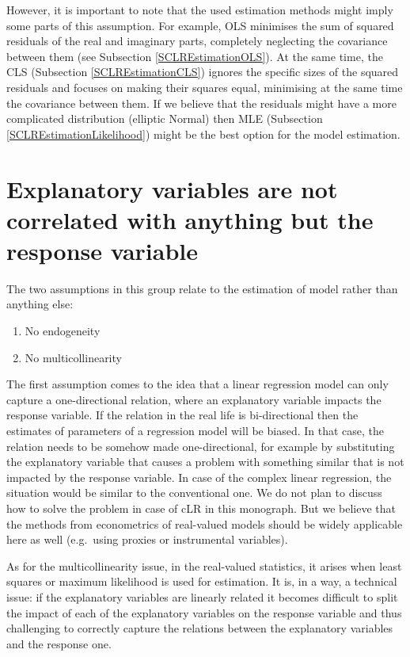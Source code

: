 \documentclass[
]{book}
\providecommand{\tightlist}{%
  \setlength{\itemsep}{0pt}\setlength{\parskip}{0pt}}
\begin{document}
However, it is important to note that the used estimation methods might imply some parts of this assumption. For example, OLS minimises the sum of squared residuals of the real and imaginary parts, completely neglecting the covariance between them (see Subsection \ref{SCLREstimationOLS}). At the same time, the CLS (Subsection \ref{SCLREstimationCLS}) ignores the specific sizes of the squared residuals and focuses on making their squares equal, minimising at the same time the covariance between them. If we believe that the residuals might have a more complicated distribution (elliptic Normal) then MLE (Subsection \ref{SCLREstimationLikelihood}) might be the best option for the model estimation.

\hypertarget{explanatory-variables-are-not-correlated-with-anything-but-the-response-variable}{%
\section{Explanatory variables are not correlated with anything but the response variable}\label{explanatory-variables-are-not-correlated-with-anything-but-the-response-variable}}

The two assumptions in this group relate to the estimation of model rather than anything else:

\begin{enumerate}
\def\labelenumi{\arabic{enumi}.}
\tightlist
\item
  No endogeneity
\item
  No multicollinearity
\end{enumerate}

The first assumption comes to the idea that a linear regression model can only capture a one-directional relation, where an explanatory variable impacts the response variable. If the relation in the real life is bi-directional then the estimates of parameters of a regression model will be biased. In that case, the relation needs to be somehow made one-directional, for example by substituting the explanatory variable that causes a problem with something similar that is not impacted by the response variable. In case of the complex linear regression, the situation would be similar to the conventional one. We do not plan to discuss how to solve the problem in case of cLR in this monograph. But we believe that the methods from econometrics of real-valued models should be widely applicable here as well (e.g.~using proxies or instrumental variables).

As for the multicollinearity issue, in the real-valued statistics, it arises when least squares or maximum likelihood is used for estimation. It is, in a way, a technical issue: if the explanatory variables are linearly related it becomes difficult to split the impact of each of the explanatory variables on the response variable and thus challenging to correctly capture the relations between the explanatory variables and the response one.
\end{document}
